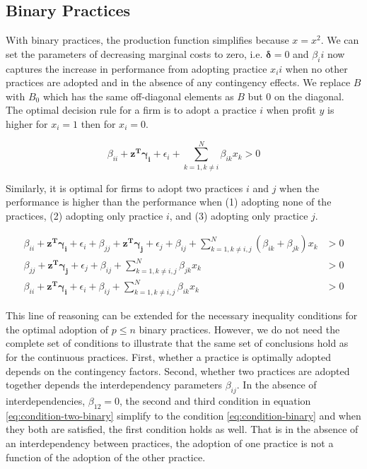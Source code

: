 \documentclass[12pt]{article}
\begin{document}
\subsection{Binary Practices}

With binary practices, the production function simplifies because $x = x^2$. We can set the parameters of decreasing marginal costs to zero, i.e. $\mathbf{\delta} = 0$ and $\beta_ii$ now captures the increase in performance from adopting practice $x_ii$ when no other practices are adopted and in the absence of any contingency effects. We replace $B$ with $B_0$ which has the same off-diagonal elements as $B$ but $0$ on the diagonal. The optimal decision rule for a firm is to adopt a practice $i$ when profit $y$ is higher for $x_i = 1$ then for $x_i = 0$. 

\begin{equation} \label{eq:condition-binary}
    \beta_{ii} + \mathbf{z^T} \mathbf{\gamma_i} + \epsilon_i 
    + \sum^{N}_{k = 1, k \neq i} \beta_{ik} x_k > 0
\end{equation}

Similarly, it is optimal for firms to adopt two practices $i$ and $j$ when the performance is higher than the performance when (1) adopting none of the practices, (2) adopting only practice $i$, and (3) adopting only practice $j$. 

\begin{equation} \label{eq:condition-two-binary}
    \begin{aligned}
        \beta_{ii} + \mathbf{z^T} \mathbf{\gamma_i} + \epsilon_i
        + \beta_{jj} + \mathbf{z^T} \mathbf{\gamma_j} + \epsilon_j
        + \beta_{ij} + \sum^{N}_{k = 1, k \neq i,j} (\beta_{ik} + \beta_{jk}) x _k &> 0 \\
        \beta_{jj} + \mathbf{z^T} \mathbf{\gamma_j} + \epsilon_j 
        + \beta_{ij} + \sum^{N}_{k = 1, k \neq i,j} \beta_{jk} x_k &> 0 \\
        \beta_{ii} + \mathbf{z^T} \mathbf{\gamma_i} + \epsilon_i
        + \beta_{ij} + \sum^{N}_{k = 1, k \neq i,j} \beta_{ik} x_k &> 0 
    \end{aligned} 
\end{equation}

This line of reasoning can be extended for the necessary inequality conditions for the optimal adoption of $p \leq n$ binary practices. However, we do not need the complete set of conditions to illustrate that the same set of conclusions hold as for the continuous practices. First, whether a practice is optimally adopted depends on the contingency factors. Second, whether two practices are adopted together depends the interdependency parameters $\beta_{ij}$. In the absence of interdependencies, $\beta_{12} = 0$, the second and third condition in equation \eqref{eq:condition-two-binary} simplify to the condition \eqref{eq:condition-binary} and when they both are satisfied, the first condition holds as well. That is in the absence of an interdependency between practices, the adoption of one practice is not a function of the adoption of the other practice.
\end{document}
